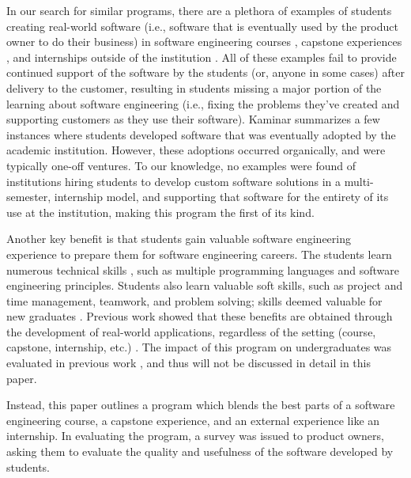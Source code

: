 In our search for similar programs, there are a plethora of examples of students creating real-world software (i.e., software that is eventually used by the product owner to do their business) in software engineering courses \cite{coursevsproject, tadayon2004software}, capstone experiences \cite{keogh2007scalable, capstone}, and internships outside of the institution \cite{rochesterfirstundergradsoftwareteam}. All of these examples fail to provide continued support of the software by the students (or, anyone in some cases) after delivery to the customer, resulting in students missing a major portion of the learning about software engineering (i.e., fixing the problems they've created and supporting customers as they use their software). Kaminar \cite{kaminer_2014} summarizes a few instances where students developed software that was eventually adopted by the academic institution. However, these adoptions occurred organically, and were typically one-off ventures. To our knowledge, no examples were found of institutions hiring students to develop custom software solutions in a multi-semester, internship model, and supporting that software for the entirety of its use at the institution, making this program the first of its kind. 

Another key benefit is that students gain valuable software engineering experience to prepare them for software engineering careers. The students learn numerous technical skills \cite{hardskills}, such as multiple programming languages and software engineering principles. Students also learn valuable soft skills, such as project and time management, teamwork, and problem solving; skills deemed valuable for new graduates \cite{lavy2013soft}. Previous work showed that these benefits are obtained through the development of real-world applications, regardless of the setting (course, capstone, internship, etc.) \cite{liu2005enriching, alzamil2005towards}. The impact of this program on undergraduates was evaluated in previous work \cite{heggen2018hiring}, and thus will not be discussed in detail in this paper. 

Instead, this paper outlines a program which blends the best parts of a software engineering course, a capstone experience, and an external experience like an internship. In evaluating the program, a survey was issued to product owners, asking them to evaluate the quality and usefulness of the software developed by students. 

